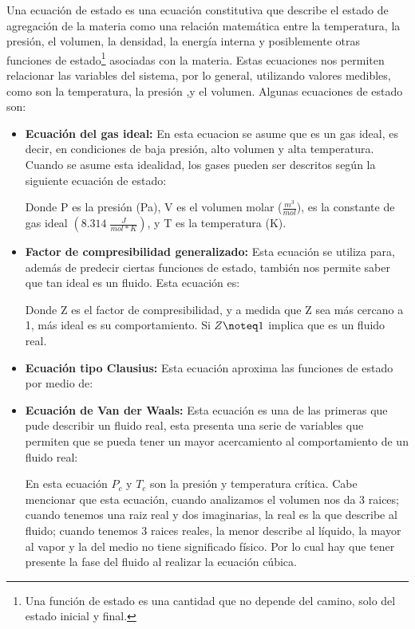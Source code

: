 Una ecuación de estado es una ecuación constitutiva que describe el estado de agregación de la materia como una relación matemática entre la temperatura, la presión, el volumen, la densidad, la energía interna y posiblemente otras funciones de estado\footnote{Una función de estado es una cantidad que no depende del camino, solo del estado inicial y final.} asociadas con la materia. 
Estas ecuaciones nos permiten relacionar las variables del sistema, por lo general, utilizando valores medibles, como son la temperatura, la presión ,y el volumen.
Algunas ecuaciones de estado son:
\begin{itemize}
    \item \textbf{Ecuación del gas ideal:} En esta ecuacion se asume que es un gas ideal, es decir, en condiciones de baja presión, alto volumen y alta temperatura. Cuando se asume esta idealidad, los gases pueden ser descritos según la siguiente ecuación de estado:

    Donde P es la presión (Pa), V es el volumen molar ($\frac{m^3}{mol}$),
      es la constante de gas ideal  $(8.314\;\frac{J}{mol*K})$, y T es la temperatura (K).

    \item \textbf{Factor de compresibilidad generalizado:} Esta ecuación se utiliza para, además de predecir ciertas funciones de estado, también nos permite saber que tan ideal es un fluido. Esta ecuación es:

    Donde Z es el factor de compresibilidad, y a medida que Z sea más cercano a 1, más ideal es su comportamiento. Si $Z\noteq 1$ implica que es un fluido real.
    \item \textbf{Ecuación tipo Clausius:} Esta ecuación aproxima las funciones de estado por medio de:

    \item \textbf{Ecuación de Van der Waals:} Esta ecuación es una de las primeras que pude describir un fluido real, esta presenta una serie de variables que permiten que se pueda tener un mayor acercamiento al comportamiento de un fluido real:
    

    En esta ecuación $P_c$ y $T_c$ son la presión y temperatura crítica. Cabe mencionar que esta ecuación, cuando analizamos el volumen nos da 3 raices; cuando tenemos una raiz real y dos imaginarias, la real es la que describe al fluido; cuando tenemos 3 raices reales, la menor describe al líquido, la mayor al vapor y la del medio no tiene significado físico. Por lo cual hay que tener presente la fase del fluido al realizar la ecuación cúbica.


\end{itemize}
